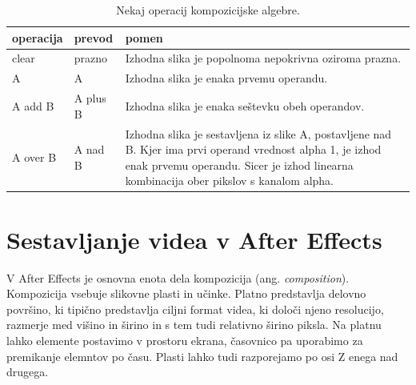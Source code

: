 \documentclass[a4paper, 12pt]{book}
\begin{document}
\begin{table}
\begin{center}
\begin{tabular}{p{} | p{} | p{} }
\hline
{\bf operacija} & {\bf prevod } & {\bf pomen} \\ \hline
clear & prazno & Izhodna slika je popolnoma nepokrivna oziroma prazna. \\ \hline
A & A & Izhodna slika je enaka prvemu operandu. \\
A add B & A plus B & Izhodna slika je enaka seštevku obeh operandov. \\ \hline
A over B & A nad B & Izhodna slika je sestavljena iz slike A, postavljene nad B. Kjer ima prvi operand vrednost alpha 1, je izhod enak prvemu operandu. 
Sicer je izhod linearna kombinacija ober pikslov s kanalom alpha.  \\ 
\end{tabular}
\end{center}
\caption{Nekaj operacij kompozicijske algebre. }
\label{tbl:kompOperacije}
\end{table}




\section{Sestavljanje videa v After Effects}

V After Effects je osnovna enota dela kompozicija (ang. {\it composition})\cite{aeclassroom}.
Kompozicija vsebuje slikovne plasti in učinke. 
Platno predstavlja delovno površino, ki tipično predstavlja ciljni format videa, ki določi njeno resolucijo, razmerje med višino in širino in s tem tudi relativno širino piksla.
Na platnu lahko elemente postavimo v prostoru ekrana,
časovnico pa uporabimo za premikanje elemntov po času.
Plasti lahko tudi razporejamo po osi Z enega nad drugega.
\end{document}
